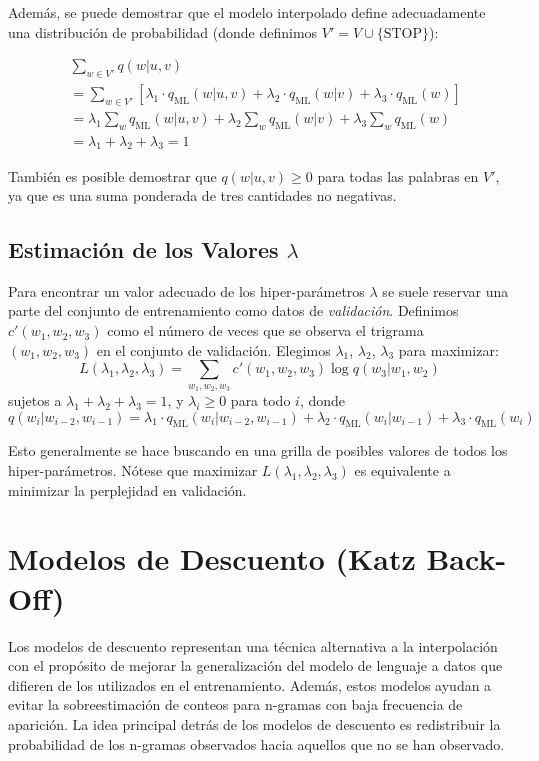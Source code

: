 Además, se puede demostrar que el modelo interpolado define adecuadamente una distribución de probabilidad (donde definimos $V' = V \cup \{\text{STOP}\}$):

\[
\begin{aligned}
    & \sum_{w \in V'} q(w | u, v) \\
    &= \sum_{w \in V'} [\lambda_1 \cdot q_{\text{ML}}(w | u, v) + \lambda_2 \cdot q_{\text{ML}}(w | v) + \lambda_3 \cdot q_{\text{ML}}(w)] \\
    &= \lambda_1 \sum_{w} q_{\text{ML}}(w | u, v) + \lambda_2 \sum_{w} q_{\text{ML}}(w | v) + \lambda_3 \sum_{w} q_{\text{ML}}(w) \\
    &= \lambda_1 + \lambda_2 + \lambda_3 = 1
\end{aligned}
\]

También es posible demostrar que $q(w | u, v) \geq 0$ para todas las palabras en $V'$, ya que es una suma ponderada de tres cantidades no negativas.



\subsection{Estimación de los Valores $\lambda$}
Para encontrar un valor adecuado de los hiper-parámetros $\lambda$ se suele reservar una parte del conjunto de entrenamiento como datos de \textit{validación}. Definimos $c'(w_1, w_2, w_3)$ como el número de veces que se observa el trigrama $(w_1, w_2, w_3)$ en el conjunto de validación. Elegimos $\lambda_1$, $\lambda_2$, $\lambda_3$ para maximizar:
    \[
    L(\lambda_1, \lambda_2, \lambda_3) = \sum_{w_1,w_2,w_3} c'(w_1, w_2, w_3) \log q(w_3 | w_1, w_2)
    \]
    sujetos a $\lambda_1 + \lambda_2 + \lambda_3 = 1$, y $\lambda_i \geq 0$ para todo $i$, donde
    \[
    q(w_i | w_{i-2}, w_{i-1}) = \lambda_1 \cdot q_{\text{ML}}(w_i | w_{i-2}, w_{i-1}) + \lambda_2 \cdot q_{\text{ML}}(w_i | w_{i-1}) + \lambda_3 \cdot q_{\text{ML}}(w_i)
    \]

Esto generalmente se hace buscando en una grilla de posibles valores de todos los hiper-parámetros. Nótese que maximizar $L(\lambda_1, \lambda_2, \lambda_3)$ es equivalente a minimizar la perplejidad en validación.


\section{Modelos de Descuento (Katz Back-Off)}

Los modelos de descuento representan una técnica alternativa a la interpolación con el propósito de mejorar la generalización del modelo de lenguaje a datos que difieren de los utilizados en el entrenamiento. Además, estos modelos ayudan a evitar la sobreestimación de conteos para n-gramas con baja frecuencia de aparición. La idea principal detrás de los modelos de descuento es redistribuir la probabilidad de los n-gramas observados hacia aquellos que no se han observado.

